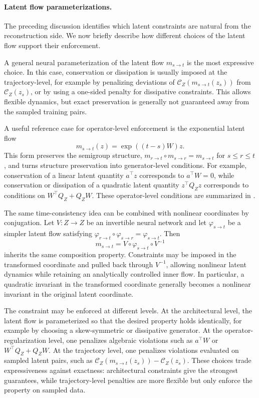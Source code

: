 \documentclass[a4paper,fleqn]{cas-sc}
\theoremstyle{thmstyleone}%
\theoremstyle{thmstyletwo}%
\theoremstyle{thmstylethree}%
\begin{document}
\paragraph{Latent flow parameterizations.}
The preceding discussion identifies which latent constraints are natural from the reconstruction side. We now briefly describe how different choices of the latent flow support their enforcement.

A general neural parameterization of the latent flow $m_{s\to t}$ is the most expressive choice. In this case, conservation or dissipation is usually imposed at the trajectory-level, for example by penalizing deviations of $\mathcal C_Z(m_{s\to t}(z_s))$ from $\mathcal C_Z(z_s)$, or by using a one-sided penalty for dissipative constraints. This allows flexible dynamics, but exact preservation is generally not guaranteed away from the sampled training pairs.

A useful reference case for operator-level enforcement is the exponential latent flow
\[
    m_{s\to t}(z)=\exp((t-s)W)z .
\]
This form preserves the semigroup structure, $m_{r\to t}\circ m_{s\to r}=m_{s\to t}$ for $s\le r\le t$, and turns structure preservation into generator-level conditions. For example, conservation of a linear latent quantity $a^\top z$ corresponds to $a^\top W=0$, while conservation or dissipation of a quadratic latent quantity $z^\top Q_Zz$ corresponds to conditions on $W^\top Q_Z+Q_ZW$. These operator-level conditions are summarized in .

The same time-consistency idea can be combined with nonlinear coordinates by conjugation. Let $V:Z\to Z$ be an invertible neural network and let $\varphi_{s\to t}$ be a simpler latent flow satisfying $\varphi_{r\to t}\circ\varphi_{s\to r}=\varphi_{s\to t}$. Then
\[
    m_{s\to t}
    =
    V\circ \varphi_{s\to t}\circ V^{-1}
\]
inherits the same composition property. Constraints may be imposed in the transformed coordinate and pulled back through $V^{-1}$, allowing nonlinear latent dynamics while retaining an analytically controlled inner flow. In particular, a quadratic invariant in the transformed coordinate generally becomes a nonlinear invariant in the original latent coordinate.

The constraint may be enforced at different levels. At the architectural level, the latent flow is parameterized so that the desired property holds identically, for example by choosing a skew-symmetric or dissipative generator. At the operator-regularization level, one penalizes algebraic violations such as $a^\top W$ or $W^\top Q_Z+Q_ZW$. At the trajectory level, one penalizes violations evaluated on sampled latent pairs, such as $\mathcal C_Z(m_{s\to t}(z_s))-\mathcal C_Z(z_s)$. These choices trade expressiveness against exactness: architectural constraints give the strongest guarantees, while trajectory-level penalties are more flexible but only enforce the property on sampled data.
\end{document}
